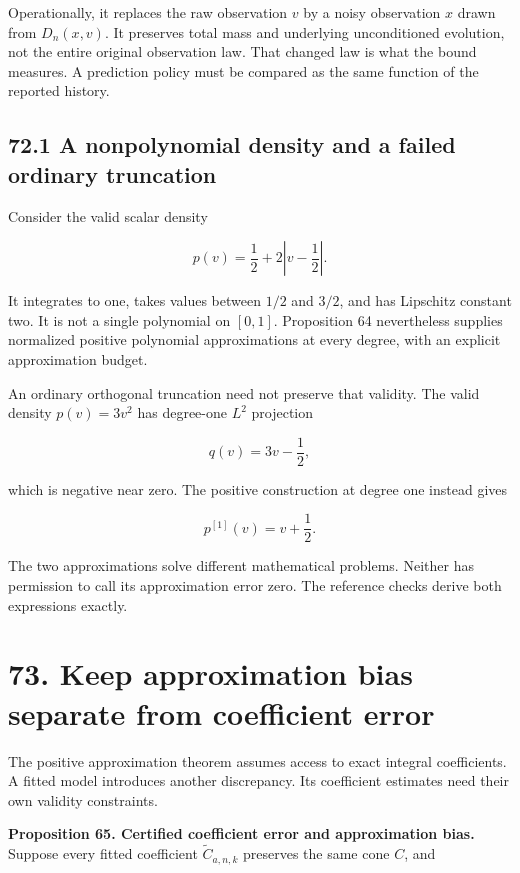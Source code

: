 \documentclass[11pt,letterpaper]{article}
\begin{document}
Operationally, it replaces the raw observation \(v\) by a noisy
observation \(x\) drawn from \(D_n(x,v)\). It preserves total mass and
underlying unconditioned evolution, not the entire original observation
law. That changed law is what the bound measures. A prediction policy
must be compared as the same function of the reported history.

\subsection{72.1 A nonpolynomial density and a failed ordinary
truncation}\label{a-nonpolynomial-density-and-a-failed-ordinary-truncation}

Consider the valid scalar density

\[
p(v)=\frac12+2\left|v-\frac12\right|.
\]

It integrates to one, takes values between \(1/2\) and \(3/2\), and has
Lipschitz constant two. It is not a single polynomial on \([0,1]\).
Proposition 64 nevertheless supplies normalized positive polynomial
approximations at every degree, with an explicit approximation budget.

An ordinary orthogonal truncation need not preserve that validity. The
valid density \(p(v)=3v^2\) has degree-one \(L^2\) projection

\[
q(v)=3v-\frac12,
\]

which is negative near zero. The positive construction at degree one
instead gives

\[
p^{[1]}(v)=v+\frac12.
\]

The two approximations solve different mathematical problems. Neither
has permission to call its approximation error zero. The reference
checks derive both expressions exactly.

\section{73. Keep approximation bias separate from coefficient
error}\label{keep-approximation-bias-separate-from-coefficient-error}

The positive approximation theorem assumes access to exact integral
coefficients. A fitted model introduces another discrepancy. Its
coefficient estimates need their own validity constraints.

\textbf{Proposition 65. Certified coefficient error and approximation
bias.} Suppose every fitted coefficient \(\widetilde C_{a,n,k}\)
preserves the same cone \(C\), and
\end{document}
